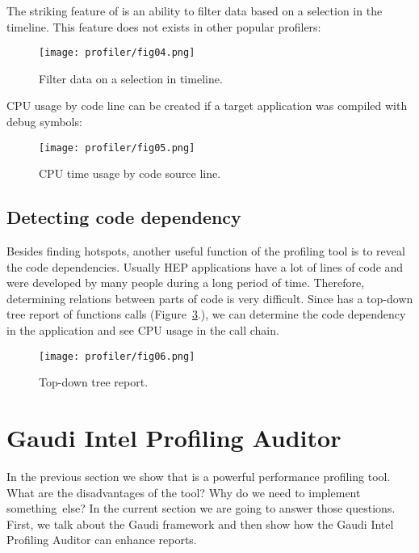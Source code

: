The striking feature of \amp is an ability to filter data based on a selection
in the timeline. This feature does not exists in other popular profilers:

\begin{figure}[H]
\begin{minipage}{\textwidth}
\texttt{[image: profiler/fig04.png]}
\caption{\label{fig04}Filter data on a selection in timeline.}
\end{minipage}
\end{figure}

CPU usage by code line can be created if a target application was compiled with
debug symbols:

\begin{figure}[H]
\begin{minipage}{\textwidth}
\texttt{[image: profiler/fig05.png]}
\caption{\label{fig05}CPU time usage by code source line.}
\end{minipage}
\end{figure}

\subsection{Detecting code dependency}

Besides finding hotspots, another useful function of the profiling tool is to
reveal the code dependencies. Usually HEP applications have a lot of lines of
code and were developed by many people during a long period of time. Therefore,
determining relations between parts of code is very difficult. Since \amp  has
a top-down tree report of functions calls (Figure~\ref{fig06}.), we can
determine the code dependency in the application and see CPU usage in the call
chain.

\begin{figure}[H]
\begin{minipage}{\textwidth}
\texttt{[image: profiler/fig06.png]}
\caption{\label{fig06}Top-down tree report.}
\end{minipage}
\end{figure}

\section[Profiling Auditor]{Gaudi Intel Profiling Auditor}

In the previous section we show that \iamp is a powerful performance profiling
tool. What are the disadvantages of the tool? Why do we need to implement
something~else? In the current section we are going to answer those questions.
First, we talk about the Gaudi framework and then show how the Gaudi Intel
Profiling Auditor can enhance \amp reports.

